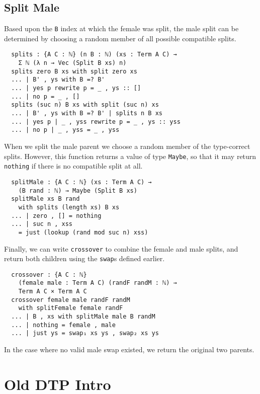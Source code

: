 \documentclass{acm_proc_article-sp}
\begin{document}
\subsection{Split Male}

Based upon the \texttt{B} index at which the female was split, the
male split can be determined by choosing a random member of all
possible compatible splits.

\begin{verbatim}
  splits : {A C : ℕ} (n B : ℕ) (xs : Term A C) →
    Σ ℕ (λ n → Vec (Split B xs) n)
  splits zero B xs with split zero xs
  ... | B' , ys with B =? B'
  ... | yes p rewrite p = _ , ys :: []
  ... | no p = _ , []
  splits (suc n) B xs with split (suc n) xs
  ... | B' , ys with B =? B' | splits n B xs
  ... | yes p | _ , yss rewrite p = _ , ys :: yss
  ... | no p | _ , yss = _ , yss
\end{verbatim}


When we split the male parent we choose a random member of the
type-correct splits. However, this function returns a value of type
\texttt{Maybe}, so that it may return \texttt{nothing} if there is no
compatible split at all.

\begin{verbatim}
  splitMale : {A C : ℕ} (xs : Term A C) →
    (B rand : ℕ) → Maybe (Split B xs)
  splitMale xs B rand
    with splits (length xs) B xs
  ... | zero , [] = nothing
  ... | suc n , xss
    = just (lookup (rand mod suc n) xss)
\end{verbatim}

Finally, we can write \texttt{crossover} to combine the female and
male splits, and return both children using the \texttt{swap}s defined
earlier.

\begin{verbatim}
  crossover : {A C : ℕ}
    (female male : Term A C) (randF randM : ℕ) →
    Term A C × Term A C
  crossover female male randF randM
    with splitFemale female randF
  ... | B , xs with splitMale male B randM
  ... | nothing = female , male
  ... | just ys = swap₁ xs ys , swap₂ xs ys
\end{verbatim}

In the case where no valid male swap existed, we return the original
two parents.

\section{Old DTP Intro}
\end{document}

